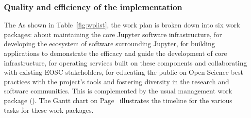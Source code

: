 

\subsubsection{Quality and efficiency of the implementation}\label{sec:workplan-structure}

\ifgrantagreement
The
\else
As shown in Table~\ref{fig:wplist}, the
\fi
work plan is broken down into
six work packages:
 about maintaining the core Jupyter software infrastructure,
 for developing the ecosystem of software surrounding Jupyter,
 for building applications to demonstrate the efficacy and guide the development
of core infrastructure,
 for operating services built on these
components and collaborating with existing EOSC stakeholders,
 for educating the public on Open Science best practices with the project's tools
and fostering diversity in the research and software communities.
This is complemented by
the usual management  work package
().
The Gantt chart on
Page~\pageref{fig:gantt} illustrates the timeline for the various
tasks for these work packages.

\ifgrantagreement\else
\wpfigstyle{\footnotesize\def\tabcolsep{3.5pt}}
{\wpfig}
\fi

